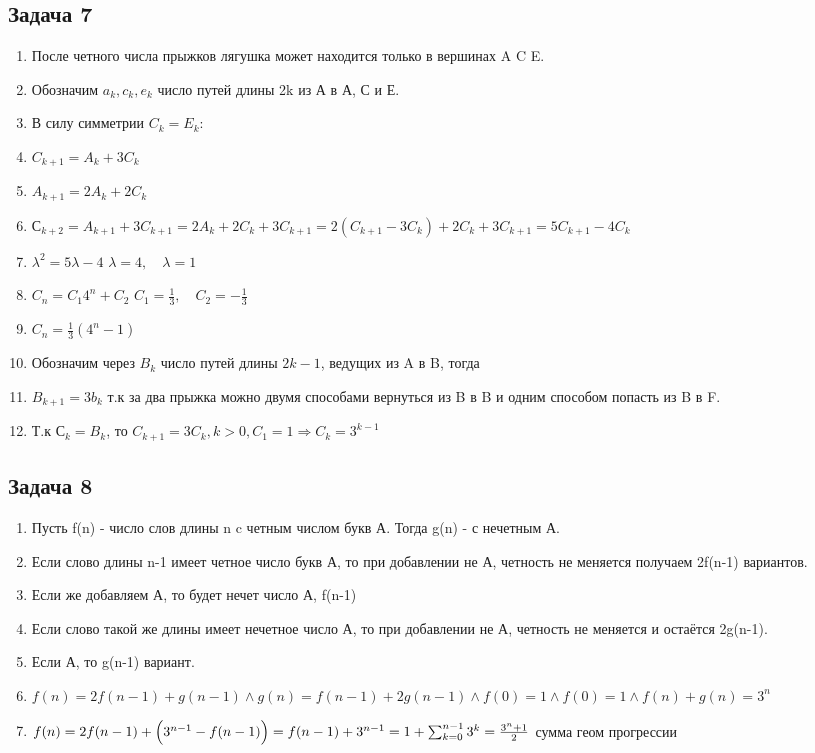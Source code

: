 \documentclass[a4paper,12pt]{article}
\begin{document}
\subsection{Задача 7}
\begin{enumerate}
    \item После четного числа прыжков лягушка может находится только в вершинах A C E.
    \item Обозначим $a_k, c_k, e_k$ число путей длины 2k из А в А, С и Е.
    \item В силу симметрии $C_k=E_k$:
    \item $C_{k+1} = A_k + 3C_k$
    \item $A_{k+1} = 2A_k+2C_k$
    \item $С_{k+2}=A_{k+1}+3C_{k+1}=2A_{k}+2C_{k}+3C_{k+1}=2(C_{k+1}-3C_k)+2C_k+3C_{k+1}=5C_{k+1}-4C_k$
    \item $\lambda^2=5 \lambda -4$ $\lambda = 4, \quad \lambda = 1$
    \item $C_n = C_1 4^n+C_2$ $C_1 = \frac{1}{3}, \quad C_2 = -\frac{1}{3}$
    \item $C_n = \frac{1}{3}(4^n-1)$
    \item Обозначим через $B_k$ число путей длины $2k-1$, ведущих из A в B, тогда
    \item $B_{k+1} = 3b_k$ т.к за два прыжка можно двумя способами вернуться из B в B и одним способом попасть из B в F.
    \item Т.к $С_k = B_k$, то $C_{k+1}=3C_k, k>0, C_1=1 \Rightarrow C_k=3^{k-1}$
\end{enumerate}

\subsection{Задача 8}
\begin{enumerate}
    \item Пусть f(n) - число слов длины n c четным числом букв А. Тогда g(n) - с нечетным А.
    \item Если слово длины n-1 имеет четное число букв А, то при добавлении не А, четность не меняется получаем 2f(n-1) вариантов.
    \item Если же добавляем А, то будет нечет число А, f(n-1)
    \item Если слово такой же длины имеет нечетное число А, то при  добавлении не А, четность не меняется и остаётся 2g(n-1).
    \item Если А, то g(n-1) вариант.
    \item $f(n)=2f(n-1)+g(n-1) \land g(n)=f(n-1)+2g(n-1) \land f(0)=1 \land f(0)=1 \land f(n)+g(n)=3^n$
    \item $f(n) = 2f(n-1) + \Bigl(3^{n-1} - f(n-1)\Bigr) = f(n-1) + 3^{n-1} =  1 + \sum_{k=0}^{n-1} 3^k = \frac{3^n+1}{2}$ сумма геом прогрессии
\end{enumerate}
\end{document}
